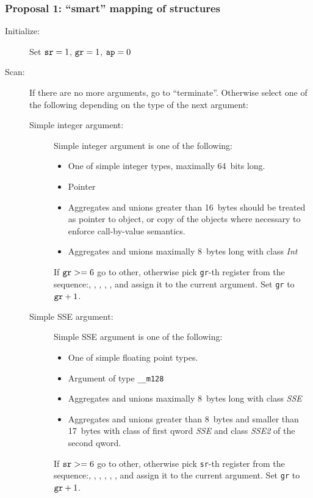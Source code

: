 \subsubsection {Proposal 1: ``smart'' mapping of structures}

\begin{description}
  \item[Initialize:]
    Set $\verb|sr|=1$, $\verb|gr|=1$, $\verb|ap|=0$


  \item[Scan:]
    If there are no more arguments, go to ``terminate''. Otherwise select one of the
    following depending on the type of the next argument:
      \begin{description}
        \item[Simple integer argument:]
          Simple integer argument is one of the following:
          \begin{itemize}
            \item One of simple integer types, maximally 64~bits long.
            \item Pointer
            \item Aggregates and unions greater than 16~bytes should be treated as
              pointer to object, or copy of the objects where necessary to enforce
              call-by-value semantics.
            \item Aggregates and unions maximally 8~bytes long with class \emph{Int}
          \end{itemize}
        If $\verb|gr| >= 6$ go to other, otherwise pick \verb|gr|-th register from
        the sequence:\RAX, \RDX, \RCX, \RBX, \RSI, \RDI{} and assign it to the current
        argument. Set \verb|gr| to $\verb|gr|+1$.


    \item[Simple SSE argument:]
      Simple SSE argument is one of the following:
      \begin{itemize}
        \item One of simple floating point types.
        \item Argument of type \verb|__m128|
        \item Aggregates and unions maximally 8~bytes long with class \emph{SSE}
        \item Aggregates and unions greater than 8~bytes and smaller than 17~bytes with class of first qword \emph{SSE}
          and class \emph{SSE2} of the second qword.
      \end{itemize}
      If $\verb|sr| >= 6$ go to other, otherwise pick \verb|sr|-th register from
      the sequence:, , , , , , 
      and assign it to the current argument.
      Set \verb|gr| to $\verb|gr|+1$.


\end{description}
\end{description}
